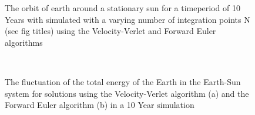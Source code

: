 \documentclass[10pt,showpacs,preprintnumbers,footinbib,amsmath,amssymb,aps,prl,twocolumn,groupedaddress,superscriptaddress,showkeys]{revtex4-1}
\begin{document}
\begin{figure}[h!p]
  \caption{The orbit of earth around a stationary sun for a timeperiod of 10 Years with simulated with a varying number of integration points N (see fig titles) using the Velocity-Verlet and Forward Euler algorithms}
\end{figure}
\twocolumngrid
 
\begin{figure}[h!]
  \center
  \\
   \caption{The fluctuation of the total energy of the Earth in the Earth-Sun system for solutions using the Velocity-Verlet algorithm (a) and the Forward Euler algorithm (b) in a 10 Year simulation}
   \label{fig:c_energy}
\end{figure}
\end{document}
